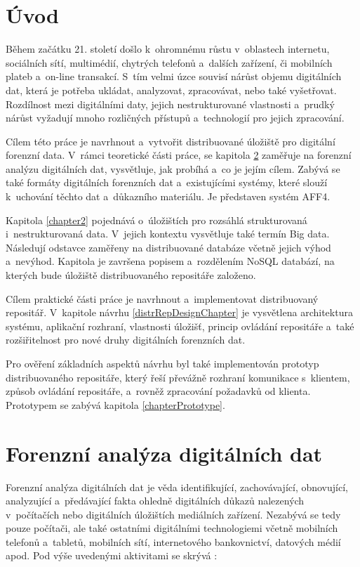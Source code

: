 

\chapter{Úvod}
Během začátku 21. století došlo k~ohromnému růstu v~oblastech internetu, sociálních sítí, multimédií, chytrých telefonů a~dalších zařízení, či mobilních plateb a~on-line transakcí. S~tím velmi úzce souvisí nárůst objemu digitálních dat, která je potřeba ukládat, analyzovat, zpracovávat, nebo také vyšetřovat. Rozdílnost mezi digitálními daty, jejich nestrukturované vlastnosti a~prudký nárůst vyžadují mnoho rozličných přístupů a~technologií pro jejich zpracování.

Cílem této práce je navrhnout a~vytvořit distribuované úložiště pro digitální forenzní data. V~rámci teoretické části práce, se kapitola \ref{chapter1} zaměřuje na forenzní analýzu digitálních dat, vysvětluje, jak probíhá a~co je jejím cílem. Zabývá se také formáty digitálních forenzních dat a~existujícími systémy, které slouží k~uchování těchto dat a~důkazního materiálu. Je představen systém AFF4.

Kapitola \ref{chapter2} pojednává o~úložištích pro rozsáhlá strukturovaná i~nestrukturovaná data. V~jejich kontextu vysvětluje také termín Big data. Následují odstavce zaměřeny na distribuované databáze včetně jejich výhod a~nevýhod. Kapitola je završena popisem a~rozdělením NoSQL databází, na kterých bude úložiště distribuovaného repositáře založeno.

Cílem praktické části práce je navrhnout a~implementovat distribuovaný repositář. V~kapitole návrhu \ref{distrRepDesignChapter} je vysvětlena architektura systému, aplikační rozhraní, vlastnosti úložišť, princip ovládání repositáře a~také rozšiřitelnost pro nové druhy digitálních forenzních dat.

Pro ověření základních aspektů návrhu byl také implementován prototyp distribuovaného repositáře, který řeší převážně rozhraní komunikace s~klientem, způsob ovládání repositáře, a~rovněž zpracování požadavků od klienta. Prototypem se zabývá kapitola \ref{chapterPrototype}.

\chapter{Forenzní analýza digitálních dat} \label{chapter1}
Forenzní analýza digitálních dat je věda identifikující, zachovávající, obnovující, analyzující a~předávající fakta ohledně digitálních důkazů nalezených v~počítačích nebo digitálních úložištích mediálních zařízení.
Nezabývá se tedy pouze počítači, ale také ostatními digitálními technologiemi včetně mobilních telefonů a~tabletů, mobilních sítí, internetového bankovnictví, datových médií apod. Pod výše uvedenými aktivitami se skrývá \cite{whatIsDigFor}:

